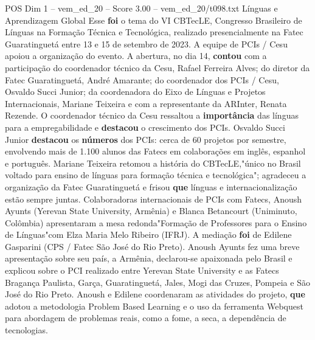 \begin{textsample}{POS Dim 1 – vem\_ed\_20 – Score 3.00 – vem\_ed\_20/t098.txt}  \label{ex:f1_pos_112}
Línguas e Aprendizagem Global Esse \textbf{foi} o tema do VI CBTecLE, Congresso Brasileiro de Línguas na Formação Técnica e Tecnológica, realizado presencialmente na Fatec Guaratinguetá entre 13 e 15 de setembro de 2023.
A equipe de PCIs / Cesu apoiou a organização do evento.
A abertura, no dia 14, \textbf{contou} com a participação do coordenador técnico da Cesu, Rafael Ferreira Alves; do diretor da Fatec Guaratinguetá, André Amarante; do coordenador dos PCIs / Cesu, Osvaldo Succi Junior; da coordenadora do Eixo de Línguas e Projetos Internacionais, Mariane Teixeira e com a representante da ARInter, Renata Rezende.
O coordenador técnico da Cesu ressaltou a \textbf{importância} das línguas para a empregabilidade e \textbf{destacou} o crescimento dos PCIs.
Osvaldo Succi Junior \textbf{destacou} os \textbf{números} dos PCIs: cerca de 60 projetos por semestre, envolvendo mais de 1.100 alunos das Fatecs em colaborações em inglês, espanhol e português.
Mariane Teixeira retomou a história do CBTecLE,"único no Brasil voltado para ensino de línguas para formação técnica e tecnológica"; agradeceu a organização da Fatec Guaratinguetá e frisou \textbf{que} línguas e internacionalização estão sempre juntas.
Colaboradoras internacionais de PCIs com Fatecs, Anoush Ayunts (Yerevan State University, Armênia) e Blanca Betancourt (Uniminuto, Colômbia) apresentaram a mesa redonda"Formação de Professores para o Ensino de Línguas"com Elza Maria Melo Ribeiro (IFRJ).
A mediação \textbf{foi} de Edilene Gasparini (CPS / Fatec São José do Rio Preto).
Anoush Ayunts fez uma breve apresentação sobre seu país, a Armênia, declarou-se apaixonada pelo Brasil e explicou sobre o PCI realizado entre Yerevan State University e as Fatecs Bragança Paulista, Garça, Guaratinguetá, Jales, Mogi das Cruzes, Pompeia e São José do Rio Preto.
Anoush e Edilene coordenaram as atividades do projeto, \textbf{que} adotou a metodologia Problem Based Learning e o uso da ferramenta Webquest para abordagem de problemas reais, como a fome, a seca, a dependência de tecnologias.

\end{textsample}

